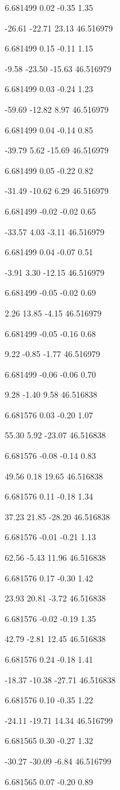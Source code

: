 6.681499
0.02
-0.35
1.35

-26.61
-22.71
23.13
46.516979

6.681499
0.15
-0.11
1.15

-9.58
-23.50
-15.63
46.516979

6.681499
0.03
-0.24
1.23

-59.69
-12.82
8.97
46.516979

6.681499
0.04
-0.14
0.85

-39.79
5.62
-15.69
46.516979

6.681499
0.05
-0.22
0.82

-31.49
-10.62
6.29
46.516979

6.681499
-0.02
-0.02
0.65

-33.57
4.03
-3.11
46.516979

6.681499
0.04
-0.07
0.51

-3.91
3.30
-12.15
46.516979

6.681499
-0.05
-0.02
0.69

2.26
13.85
-4.15
46.516979

6.681499
-0.05
-0.16
0.68

9.22
-0.85
-1.77
46.516979

6.681499
-0.06
-0.06
0.70

9.28
-1.40
9.58
46.516838

6.681576
0.03
-0.20
1.07

55.30
5.92
-23.07
46.516838

6.681576
-0.08
-0.14
0.83

49.56
0.18
19.65
46.516838

6.681576
0.11
-0.18
1.34

37.23
21.85
-28.20
46.516838

6.681576
-0.01
-0.21
1.13

62.56
-5.43
11.96
46.516838

6.681576
0.17
-0.30
1.42

23.93
20.81
-3.72
46.516838

6.681576
-0.02
-0.19
1.35

42.79
-2.81
12.45
46.516838

6.681576
0.24
-0.18
1.41

-18.37
-10.38
-27.71
46.516838

6.681576
0.10
-0.35
1.22

-24.11
-19.71
14.34
46.516799

6.681565
0.30
-0.27
1.32

-30.27
-30.09
-6.84
46.516799

6.681565
0.07
-0.20
0.89

